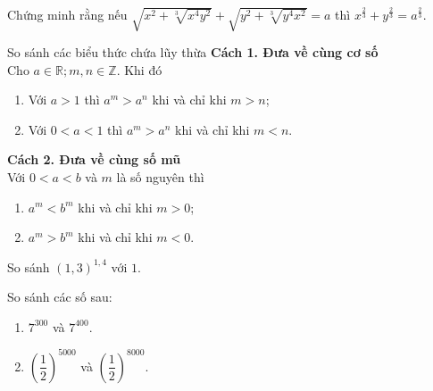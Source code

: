 \begin{bt}%
	Chứng minh rằng nếu $\sqrt{x^2+\sqrt[3]{x^4y^2}}+\sqrt{y^2+\sqrt[3]{y^4x^2}}=a$ thì $x^{\frac{2}{3}}+y^{\frac{2}{3}}=a^{\frac{2}{3}}$.
\end{bt}
\begin{dang}{So sánh các biểu thức chứa lũy thừa}
	\textbf{Cách 1. Đưa về cùng cơ số}\\
	Cho $a\in \mathbb{R}; m,n\in \mathbb{Z}$. Khi đó
	\begin{enumerate}[\bf 1.]
		\item Với $a>1$ thì $a^m>a^n$ khi và chỉ khi $m>n$;
		\item Với $0<a<1$ thì $a^m>a^n$ khi và chỉ khi $m<n$.
	\end{enumerate}
	\textbf{Cách 2. Đưa về cùng số mũ}\\
	Với $0<a<b$ và $m$ là số nguyên thì
	\begin{multicols}{2}
		\begin{enumerate}[\bf 1.]
			\item $a^m<b^m$ khi và chỉ khi $m>0$;
			\item $a^m>b^m$ khi và chỉ khi $m<0$.
		\end{enumerate}
	\end{multicols}
\end{dang}
\begin{vd}%
	So sánh $(1,3)^{1,4}$ với $1$.
\end{vd}
\begin{vd}%
	So sánh các số sau:
	\begin{enumerate}
		\item $7^{300}$ và $7^{400}$.
		\item $\left( \dfrac{1}{2} \right)^{5000} $ và $\left( \dfrac{1}{2} \right)^{8000} $.
	\end{enumerate}
\end{vd}
